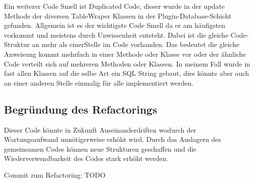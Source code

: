 Ein weiterer Code Smell ist Duplicated Code, dieser wurde in der update Methode der diversen TableWraper Klassen in der Plugin-Database-Schicht gefunden.
Allgemein ist es der wichtigste Code Smell da er am häufigsten vorkommt und meistens durch Unwissenheit entsteht.
Dabei ist die gleiche Code-Struktur an mehr als einerStelle im Code vorhanden.
Das bedeutet die gleiche Anweisung kommt mehrfach in einer Methode oder Klasse vor oder der ähnliche Code verteilt sich auf mehreren Methoden oder Klassen.
In meinem Fall wurde in fast allen Klassen auf die selbe Art ein SQL String gebaut, dies könnte aber auch an einer anderen Stelle einmalig für alle implementiert werden.

\subsection{Begründung des Refactorings}

Dieser Code könnte in Zukunft Auseinanderdriften wodurch der Wartungsaufwand unnötigerweise erhöht wird.
Durch das Auslagern des gemeinsamen Codes können neue Strukturen geschaffen und die Wiederverwendbarkeit des Codes stark erhöht werden.


Commit zum Refactoring: TODO


